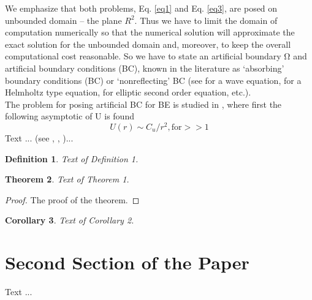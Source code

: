 \documentclass[12pt]{article}
\theoremstyle{theorem}
\newtheorem{theorem}{Theorem}
\newtheorem{corollary}[theorem]{Corollary}
\theoremstyle{defi}
\newtheorem{definition}[theorem]{Definition}
\begin{document}
We emphasize that both problems, Eq. \ref{eq1} and Eq. \ref{eq3}, are posed on unbounded domain – the plane $R^2$. Thus we have to limit the domain of computation numerically so that the numerical solution will approximate the exact solution for the unbounded domain and, moreover, to keep the overall computational cost reasonable.
So we have to state an artificial boundary $Ω$ and artificial boundary conditions (BC), known in the literature as ‘absorbing’ boundary conditions (BC) or ‘nonreflecting’ BC (see \cite{ref11} for a wave equation, \cite{ref12} for a Helmholtz type equation, \cite{ref13} for elliptic second order equation, etc.). 
\\
The problem for posing artificial BC for BE is studied in \cite{ref6}, where first the following asymptotic of U is found
\begin{equation}
U(r) \sim  C_u/r^2, \text{for} >> 1\label{eq4}
\end{equation}
Text ... (see \cite{gasrah}, \cite{rosbl}, \cite{Moak})...


\begin{definition}
Text of Definition 1.
\end{definition}

\begin{theorem}
Text of Theorem 1.
\end{theorem}

\begin{proof}
The proof of the theorem.
\end{proof}

\begin{corollary}
Text of Corollary 2.
\end{corollary}

\section{Second Section of the Paper}

Text ...
\end{document}
